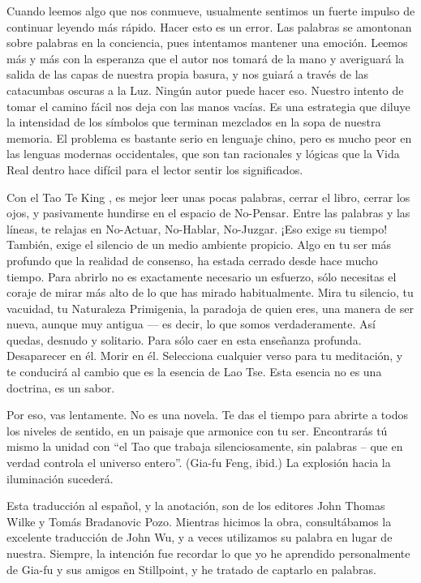 \documentclass[book,b5paper,hidelinks,final]{memoir}
\begin{document}
	Cuando leemos algo que nos conmueve, usualmente sentimos un fuerte
	impulso de continuar leyendo más rápido. Hacer esto es un error. Las
	palabras se amontonan sobre palabras en la conciencia, pues intentamos
	mantener una emoción. Leemos más y más con la esperanza que el autor nos
	tomará de la mano y averiguará la salida de las capas de nuestra propia
	basura, y nos guiará a través de las catacumbas oscuras a la Luz. Ningún
	autor puede hacer eso. Nuestro intento de tomar el camino fácil nos deja
	con las manos vacías. Es una estrategia que diluye la intensidad de los
	símbolos que terminan mezclados en la sopa de nuestra memoria. El
	problema es bastante serio en lenguaje chino, pero es mucho peor en las
	lenguas modernas occidentales, que son tan racionales y lógicas que la
	Vida Real dentro hace difícil para el lector sentir los significados.
	
	Con el Tao Te King , es mejor leer unas pocas palabras, cerrar el libro,
	cerrar los ojos, y pasivamente hundirse en el espacio de No-Pensar.
	Entre las palabras y las líneas, te relajas en No-Actuar, No-Hablar,
	No-Juzgar. ¡Eso exige su tiempo! También, exige el silencio de un medio
	ambiente propicio. Algo en tu ser más profundo que la realidad de
	consenso, ha estada cerrado desde hace mucho tiempo. Para abrirlo no es
	exactamente necesario un esfuerzo, sólo necesitas el coraje de mirar más
	alto de lo que has mirado habitualmente. Mira tu silencio, tu vacuidad,
	tu Naturaleza Primigenia, la paradoja de quien eres, una manera de ser
	nueva, aunque muy antigua --- es decir, lo que somos verdaderamente. Así
	quedas, desnudo y solitario. Para sólo caer en esta enseñanza profunda.
	Desaparecer en él. Morir en él. Selecciona cualquier verso para tu
	meditación, y te conducirá al cambio que es la esencia de Lao Tse. Esta
	esencia no es una doctrina, es un sabor.
	
	Por eso, vas lentamente. No es una novela. Te das el tiempo para abrirte
	a todos los niveles de sentido, en un paisaje que armonice con tu ser.
	Encontrarás tú mismo la unidad con ``el Tao que trabaja silenciosamente,
	sin palabras -- que en verdad controla el universo entero''. (Gia-fu
	Feng, ibid.) La explosión hacia la iluminación sucederá.
	
	Esta traducción al español, y la anotación, son de los editores John
	Thomas Wilke y Tomás Bradanovic Pozo. Mientras hicimos la obra,
	consultábamos la excelente traducción de John Wu, y a veces utilizamos
	su palabra en lugar de nuestra. Siempre, la intención fue recordar lo
	que yo he aprendido personalmente de Gia-fu y sus amigos en Stillpoint,
	y he tratado de captarlo en palabras.
	
\end{document}
